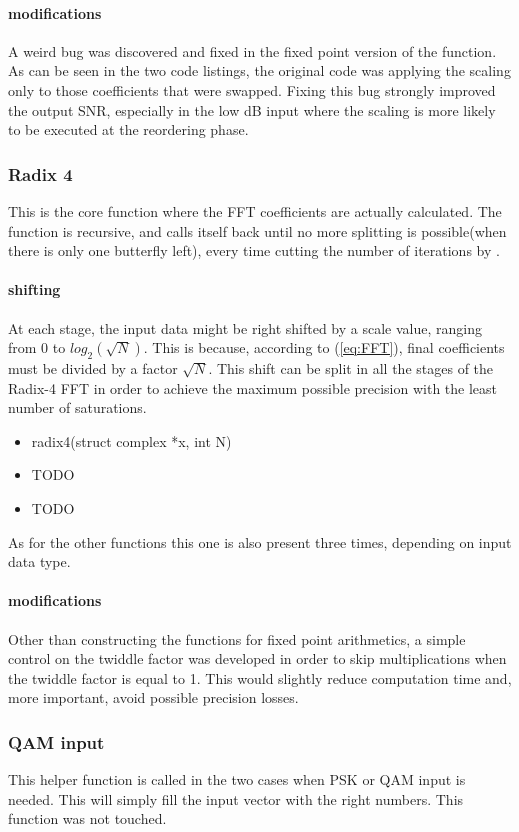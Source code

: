 \documentclass[a4paper]{article}
\begin{document}
	\paragraph{modifications}
	A weird bug was discovered and fixed in the fixed point version of the function. As can be seen in the two code listings, the original code was applying the scaling only to those coefficients that were swapped. Fixing this bug strongly improved the output SNR, especially in the low dB input where the scaling is more likely to be executed at the reordering phase.


\subsubsection{Radix 4}
This is the core function where the FFT coefficients are actually calculated. The function is recursive, and calls itself back until no more splitting is possible(when there is only one butterfly left), every time cutting the number of iterations by .
\paragraph{shifting}
At each stage, the input data might be right shifted by a scale value, ranging from 0 to $log_2(\sqrt{N})$. This is because, according to (\ref{eq:FFT}), final coefficients must be divided by a factor $\sqrt{N}$. This shift can be split in all the stages of the Radix-4 FFT in order to achieve the maximum possible precision with the least number of saturations.
\begin{itemize}
	\item radix4(struct complex *x, int N)
	\item TODO
	\item TODO
\end{itemize}
As for the other functions this one is also present three times, depending on input data type.
\paragraph{modifications}
Other than constructing the functions for fixed point arithmetics, a simple control on the twiddle factor was developed in order to skip multiplications when the twiddle factor is equal to 1. This would slightly reduce computation time and, more important, avoid possible precision losses. 

\subsubsection{QAM input}
This helper function is called in the two cases when PSK or QAM input is needed. This will simply fill the input vector with the right numbers. This function was not touched.
\end{document}
